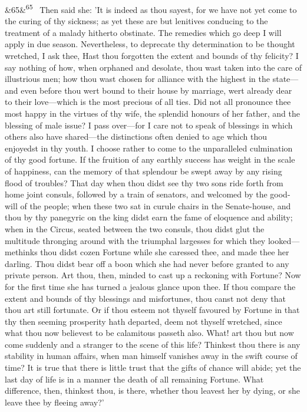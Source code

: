 \documentclass[12pt]{article}
\newcommand{\para}[1][]{\par\noindent\ifx&#1&\else\textsuperscript{\footnotesize #1}~\fi}
\begin{document}
\para[65] Then said she: 'It is indeed as thou sayest, for we have not yet come to the curing of thy sickness; as yet these are but lenitives conducing to the treatment of a malady hitherto obstinate. The remedies which go deep I will apply in due season. Nevertheless, to deprecate thy determination to be thought wretched, I ask thee, Hast thou forgotten the extent and bounds of thy felicity? I say nothing of how, when orphaned and desolate, thou wast taken into the care of illustrious men; how thou wast chosen for alliance with the highest in the state---and even before thou wert bound to their house by marriage, wert already dear to their love---which is the most precious of all ties. Did not all pronounce thee most happy in the virtues of thy wife, the splendid honours of her father, and the blessing of male issue? I pass over---for I care not to speak of blessings in which others also have shared---the distinctions often denied to age which thou enjoyedst in thy youth. I choose rather to come to the unparalleled culmination of thy good fortune. If the fruition of any earthly success has weight in the scale of happiness, can the memory of that splendour be swept away by any rising flood of troubles? That day when thou didst see thy two sons ride forth from home joint consuls, followed by a train of senators, and welcomed by the good-will of the people; when these two sat in curule chairs in the Senate-house, and thou by thy panegyric on the king didst earn the fame of eloquence and ability; when in the Circus, seated between the two consuls, thou didst glut the multitude thronging around with the triumphal largesses for which they looked---methinks thou didst cozen Fortune while she caressed thee, and made thee her darling. Thou didst bear off a boon which she had never before granted to any private person. Art thou, then, minded to cast up a reckoning with Fortune? Now for the first time she has turned a jealous glance upon thee. If thou compare the extent and bounds of thy blessings and misfortunes, thou canst not deny that thou art still fortunate. Or if thou esteem not thyself favoured by Fortune in that thy then seeming prosperity hath departed, deem not thyself wretched, since what thou now believest to be calamitous passeth also. What! art thou but now come suddenly and a stranger to the scene of this life? Thinkest thou there is any stability in human affairs, when man himself vanishes away in the swift course of time? It is true that there is little trust that the gifts of chance will abide; yet the last day of life is in a manner the death of all remaining Fortune. What difference, then, thinkest thou, is there, whether thou leavest her by dying, or she leave thee by fleeing away?'
\end{document}
